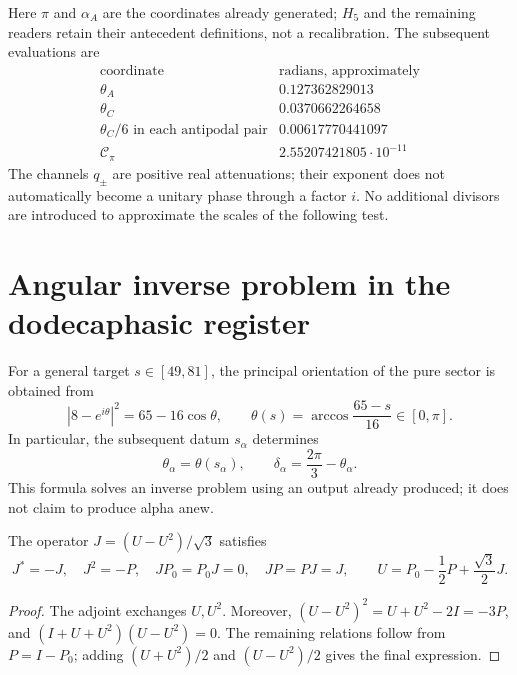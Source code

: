 Here \(\pi\) and \(\alpha_A\) are the coordinates already generated; \(H_5\) and the remaining readers retain their antecedent definitions, not a recalibration. The subsequent evaluations are
\[
\begin{array}{c|c}
 \text{coordinate}&\text{radians, approximately}\\\hline
 \theta_A&0.127362829013\\
 \theta_C&0.0370662264658\\
 \theta_C/6\text{ in each antipodal pair}&0.00617770441097\\
 \mathcal C_\pi&2.55207421805\cdot10^{-11}
\end{array}
\]
The channels \(q_\pm\) are positive real attenuations; their exponent does not automatically become a unitary phase through a factor \(i\). No additional divisors are introduced to approximate the scales of the following test.

\section{Angular inverse problem in the dodecaphasic register}
\label{x_reciprocidad:lib02:ensayo-angular}

For a general target \(s\in[49,81]\), the principal orientation of the pure sector is obtained from
\[
 |8-e^{i\theta}|^2=65-16\cos\theta,
 \qquad \theta(s)=\arccos\frac{65-s}{16}\in[0,\pi].
\]
In particular, the subsequent datum \(s_\alpha\) determines
\[
 \theta_\alpha=\theta(s_\alpha),\qquad
 \delta_\alpha=\frac{2\pi}{3}-\theta_\alpha.
\]
This formula solves an inverse problem using an output already produced; it does not claim to produce alpha anew.

\begin{lemma}
\label{x_reciprocidad:lib02:J}
The operator \(J=(U-U^2)/\sqrt3\) satisfies
\[
 J^*=-J,\quad J^2=-P,\quad JP_0=P_0J=0,\quad JP=PJ=J,
 \qquad U=P_0-\frac12P+\frac{\sqrt3}{2}J.
\]
\end{lemma}
\begin{proof}
The adjoint exchanges \(U,U^2\). Moreover, \((U-U^2)^2=U+U^2-2I=-3P\), and \((I+U+U^2)(U-U^2)=0\). The remaining relations follow from \(P=I-P_0\); adding \((U+U^2)/2\) and \((U-U^2)/2\) gives the final expression.
\end{proof}

